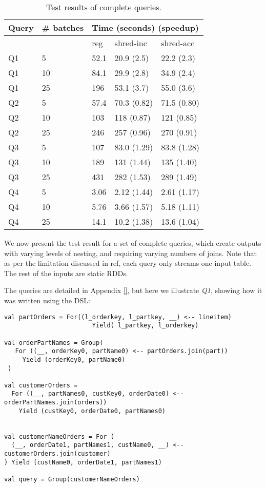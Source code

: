 \begin{table}[]
\begin{tabular}{|l|l|l|l|l|}
\hline
Query & \# batches & \multicolumn{3}{l|}{Time (seconds) (speedup)} \\ \hline
      &            & reg       & shred-inc       & shred-acc       \\ \hline
Q1    & 5          & 52.1      & 20.9 (2.5)      & 22.2 (2.3)      \\ \hline
Q1    & 10         & 84.1      & 29.9 (2.8)      & 34.9 (2.4)      \\ \hline
Q1    & 25         & 196       & 53.1 (3.7)      & 55.0 (3.6)      \\ \hline
Q2    & 5          & 57.4      & 70.3 (0.82)     & 71.5 (0.80)     \\ \hline
Q2    & 10         & 103       & 118 (0.87)      & 121 (0.85)      \\ \hline
Q2    & 25         & 246       & 257 (0.96)      & 270 (0.91)      \\ \hline
Q3    & 5          & 107       & 83.0 (1.29)     & 83.8 (1.28)     \\ \hline
Q3    & 10         & 189       & 131 (1.44)      & 135 (1.40)      \\ \hline
Q3    & 25         & 431       & 282 (1.53)      & 289 (1.49)      \\ \hline
Q4    & 5          & 3.06      & 2.12 (1.44)     & 2.61 (1.17)     \\ \hline
Q4    & 10         & 5.76      & 3.66 (1.57)     & 5.18 (1.11)     \\ \hline
Q4    & 25         & 14.1      & 10.2 (1.38)     & 13.6 (1.04)     \\ \hline
\end{tabular}
\caption{Test results of complete queries.}
\label{mainresults}
\end{table}

We now present the test result for a set of complete queries, which create outputs with varying levels of nesting, and requiring varying numbers of joins. Note that as per the limitation discussed in ref{}, each query only streams one input table. The rest of the inputs are static RDDs.

The queries are detailed in Appendix \ref{}, but here we illustrate \textit{Q1}, showing how it was written using the DSL:
\vs\begin{lstlisting}
val partOrders = For((l_orderkey, l_partkey, __) <-- lineitem)
                        Yield( l_partkey, l_orderkey)
                        
val orderPartNames = Group(
   For ((__, orderKey0, partName0) <-- partOrders.join(part))
     Yield (orderKey0, partName0)
 )

val customerOrders =
  For ((__, partNames0, custKey0, orderDate0) <-- orderPartNames.join(orders))
    Yield (custKey0, orderDate0, partNames0)


val customerNameOrders = For (
  (__, orderDate1, partNames1, custName0, __) <-- customerOrders.join(customer)
) Yield (custName0, orderDate1, partNames1)

val query = Group(customerNameOrders)
\end{lstlisting}\vs

